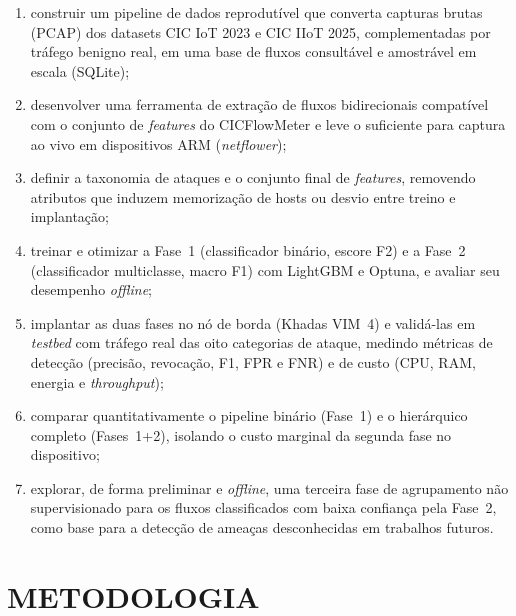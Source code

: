 \documentclass[12pt,a4paper]{article}
\begin{document}
\begin{enumerate}
  \item construir um pipeline de dados reprodutível que converta capturas
    brutas (PCAP) dos datasets CIC IoT 2023 e CIC IIoT 2025, complementadas
    por tráfego benigno real, em uma base de fluxos consultável e amostrável
    em escala (SQLite);
  \item desenvolver uma ferramenta de extração de fluxos bidirecionais
    compatível com o conjunto de \textit{features} do CICFlowMeter e leve o
    suficiente para captura ao vivo em dispositivos ARM (\textit{netflower});
  \item definir a taxonomia de ataques e o conjunto final de
    \textit{features}, removendo atributos que induzem memorização de hosts
    ou desvio entre treino e implantação;
  \item treinar e otimizar a Fase~1 (classificador binário, escore F2) e a
    Fase~2 (classificador multiclasse, macro F1) com LightGBM e Optuna, e
    avaliar seu desempenho \textit{offline};
  \item implantar as duas fases no nó de borda (Khadas VIM~4) e validá-las em
    \textit{testbed} com tráfego real das oito categorias de ataque, medindo
    métricas de detecção (precisão, revocação, F1, FPR e FNR) e de custo (CPU,
    RAM, energia e \textit{throughput});
  \item comparar quantitativamente o pipeline binário (Fase~1) e o
    hierárquico completo (Fases~1+2), isolando o custo marginal da segunda
    fase no dispositivo;
  \item explorar, de forma preliminar e \textit{offline}, uma terceira fase de
    agrupamento não supervisionado para os fluxos classificados com baixa
    confiança pela Fase~2, como base para a detecção de ameaças desconhecidas
    em trabalhos futuros.
\end{enumerate}

\section{METODOLOGIA}
\label{sec:metodologia}
\end{document}
